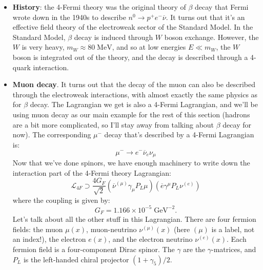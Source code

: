 \documentclass[12pt, oneside]{article}   	%
\theoremstyle{definition}
\begin{document}
\begin{itemize}

	\item \textbf{History}: the 4-Fermi theory was the original theory of $\beta$ decay that Fermi wrote down in the 1940s to describe $n^0 \rightarrow p^+ e^- \overline\nu$. It turns out that it's an effective field theory of the electroweak sector of the Standard Model. In the Standard Model, $\beta$ decay is induced through $W$ boson exchange. However, the $W$ is very heavy, $m_W\approx 80\;\mathrm{MeV}$, and so at low energies $E\ll m_W$, the $W$ boson is integrated out of the theory, and the decay is described through a 4-quark interaction. 
	
	\item \textbf{Muon decay}. It turns out that the decay of the muon can also be described through the electroweak interactions, with almost exactly the same physics as for $\beta$ decay. The Lagrangian we get is also a 4-Fermi Lagrangian, and we'll be using muon decay as our main example for the rest of this section (hadrons are a bit more complicated, so I'll stay away from talking about $\beta$ decay for now). The corresponding $\mu^-$ decay that's described by a 4-Fermi Lagrangian is:
	\begin{equation}
		\mu^-\rightarrow e^- \overline\nu_e \nu_\mu
	\end{equation}
	Now that we've done spinors, we have enough machinery to write down the interaction part of the 4-Fermi theory Lagrangian:
	\begin{equation}
		\mathcal L_{4F}\supset\frac{4 G_F}{\sqrt 2} (\overline\nu^{(\mu)} \gamma_\mu P_L \mu) (\overline e \gamma^\mu P_L \nu^{(e)})
	\end{equation}
	where the coupling is given by:
	\begin{equation}
		G_F = 1.166\times 10^{-5} \;\mathrm{GeV}^{-2}.
	\end{equation}
	Let's talk about all the other stuff in this Lagrangian. There are four fermion fields: the muon $\mu(x)$, muon-neutrino $\nu^{(\mu)}(x)$ (here $(\mu)$ is a label, not an index!), the electron $e(x)$, and the electron neutrino $\nu^{(e)}(x)$. Each fermion field is a four-component Dirac spinor. The $\gamma$ are the $\gamma$-matrices, and $P_L$ is the left-handed chiral projector $(1 + \gamma_5) / 2$. 
	

\end{itemize}
\end{document}
